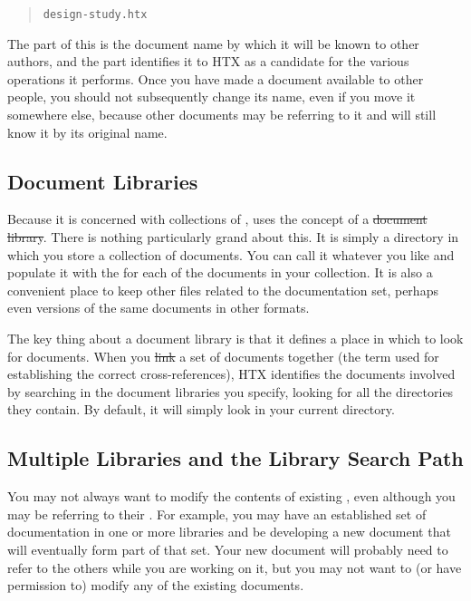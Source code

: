 \begin{quote}
\begin{verbatim}
design-study.htx
\end{verbatim}
\end{quote}

The  part of this is the document name by which it
will be known to other authors, and the  part identifies it to
HTX as a candidate for the various operations it performs. Once you
have made a document available to other people, you should not
subsequently change its name, even if you move it somewhere else,
because other documents may be referring to it and will still know it
by its original name.

\subsection{\label{sect:documentlibraries}Document Libraries}

Because it is concerned with collections of ,  uses the concept of a \st{document
library}. There is nothing particularly grand about this.  It is
simply a directory in which you store a collection of documents. You
can call it whatever you like and populate it with the
 for each of the documents in your
collection. It is also a convenient place to keep other files related
to the documentation set, perhaps even versions of the same documents
in other formats.

The key thing about a document library is that it defines a place in
which to look for documents. When you \st{link} a set of documents
together (the term used for establishing the correct
cross-references), HTX identifies the documents involved by searching
in the document libraries you specify, looking for all the 
directories they contain. By default, it will simply look in your
current directory.

\subsection{\label{sect:searchpath}Multiple Libraries and the Library Search Path}

You may not always want to modify the contents of existing
, even although you may be referring to their
.  For example, you may have an established set of
documentation in one or more libraries and be developing a new
document that will eventually form part of that set. Your new document
will probably need to refer to the others while you are working on it,
but you may not want to (or have permission to) modify any of the
existing documents.

